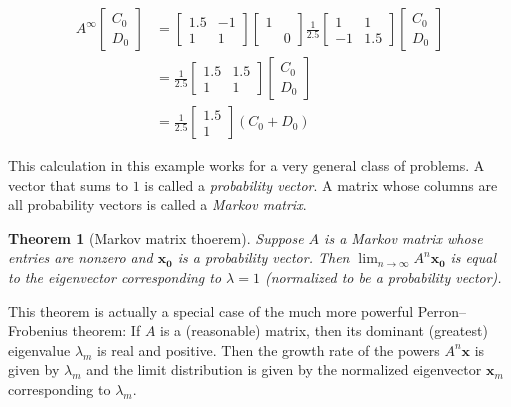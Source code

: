 \documentclass[11pt,oneside]{amsbook}
\theoremstyle{definition}
\theoremstyle{plain}
\newtheorem{theorem}{Theorem}[section]
\theoremstyle{definition}
\theoremstyle{remark}
\numberwithin{equation}{section}
\numberwithin{figure}{section}
\begin{document}
\begin{align*}
  A^\infty\begin{bmatrix}C_0\\D_0\end{bmatrix}
  &=\begin{bmatrix}1.5&-1\\1&1\end{bmatrix}
    \begin{bmatrix}1\\&0\end{bmatrix}
    \frac{1}{2.5}
    \begin{bmatrix}1&1\\-1&1.5\end{bmatrix}
    \begin{bmatrix}C_0\\D_0\end{bmatrix}\\
  &=\frac{1}{2.5}\begin{bmatrix}1.5&1.5\\1&1\end{bmatrix}
     \begin{bmatrix}C_0\\D_0\end{bmatrix}\\
  &=\frac{1}{2.5}\begin{bmatrix}1.5\\1\end{bmatrix}
   (C_0+D_0)
\end{align*}

This calculation in this example works for a very general class of problems. A vector that sums to $1$ is called a \emph{probability vector}. A matrix whose columns are all probability vectors is called a \emph{Markov matrix}.

\begin{theorem}[Markov matrix thoerem]
  Suppose $A$ is a Markov matrix whose entries are nonzero and $\mathbf{x_0}$ is a probability vector. Then $\lim_{n\to\infty}A^n\mathbf{x_0}$ is equal to the eigenvector corresponding to $\lambda=1$ (normalized to be a probability vector).
\end{theorem}

This theorem is actually a special case of the much more powerful Perron--Frobenius theorem: If $A$ is a (reasonable) matrix, then its dominant (greatest) eigenvalue $\lambda_m$ is real and positive. Then the growth rate of the powers $A^n\mathbf{x}$ is given by $\lambda_m$ and the limit distribution is given by the normalized eigenvector $\mathbf{x}_m$ corresponding to $\lambda_m$.
\end{document}
